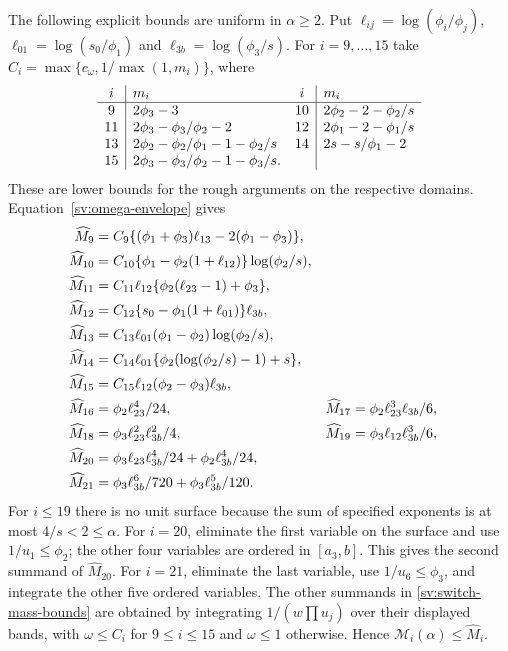 The following explicit bounds are uniform in $\alpha\ge2$.
Put $\ell_{ij}=\log(\phi_i/\phi_j)$,
$\ell_{01}=\log(s_0/\phi_1)$ and $\ell_{3b}=\log(\phi_3/s)$.
For $i=9,\ldots,15$ take $C_i=\max\{c_\omega,1/\max(1,m_i)\}$,
where
\[
\begin{array}{c|l@{\quad}c|l}
i&m_i&i&m_i\\ \hline
9&2\phi_3-3&10&2\phi_2-2-\phi_2/s\\
11&2\phi_3-\phi_3/\phi_2-2
 &12&2\phi_1-2-\phi_1/s\\
13&2\phi_2-\phi_2/\phi_1-1-\phi_2/s
 &14&2s-s/\phi_1-2\\
15&2\phi_3-\phi_3/\phi_2-1-\phi_3/s.&&
\end{array}
\]
These are lower bounds for the rough arguments on the respective
domains.  Equation~\eqref{sv:omega-envelope} gives
\begin{align}\label{sv:switch-mass-bounds}
 \widehat M_9&=C_9\{(\phi_1+\phi_3)\ell_{13}-2(\phi_1-\phi_3)\},\notag\\
 \widehat M_{10}&=C_{10}\{\phi_1-\phi_2(1+\ell_{12})\}
                                          \log(\phi_2/s),\notag\\
 \widehat M_{11}&=C_{11}\ell_{12}\{\phi_2(\ell_{23}-1)+\phi_3\},\notag\\
 \widehat M_{12}&=C_{12}\{s_0-\phi_1(1+\ell_{01})\}\ell_{3b},\notag\\
 \widehat M_{13}&=C_{13}\ell_{01}(\phi_1-\phi_2)\log(\phi_2/s),\notag\\
 \widehat M_{14}&=C_{14}\ell_{01}
                       \{\phi_2(\log(\phi_2/s)-1)+s\},\notag\\
 \widehat M_{15}&=C_{15}\ell_{12}(\phi_2-\phi_3)\ell_{3b},\notag\\
 \widehat M_{16}&=\phi_2\ell_{23}^4/24,
 &\widehat M_{17}&=\phi_2\ell_{23}^3\ell_{3b}/6,\notag\\
 \widehat M_{18}&=\phi_3\ell_{23}^2\ell_{3b}^2/4,
 &\widehat M_{19}&=\phi_3\ell_{12}\ell_{3b}^3/6,\notag\\
 \widehat M_{20}&=\phi_3\ell_{23}\ell_{3b}^4/24
                         +\phi_2\ell_{3b}^4/24,\notag\\
 \widehat M_{21}&=\phi_3\ell_{3b}^6/720+\phi_3\ell_{3b}^5/120.
 \end{align}
For $i\le19$ there is no unit surface because the sum of specified
exponents is at most $4/s<2\le\alpha$.
For $i=20$, eliminate the first variable on the surface and use
$1/u_1\le\phi_2$; the other four variables are ordered in
$[a_3,b]$.  This gives the second summand of $\widehat M_{20}$.
For $i=21$, eliminate the last variable, use $1/u_6\le\phi_3$,
and integrate the other five ordered variables.  The other
summands in \eqref{sv:switch-mass-bounds} are obtained by
integrating $1/(w\prod u_j)$ over their displayed bands, with
$\omega\le C_i$ for $9\le i\le15$ and $\omega\le1$
otherwise.  Hence $\mathcal M_i(\alpha)\le\widehat M_i$.

